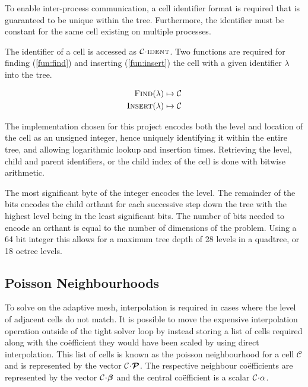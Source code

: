 \documentclass{IIBproject}
\newcommand{\vect}[1]{\bm{#1}}
\newcommand{\acc}{{\mkern 0.5mu\cdot\mkern 0.5mu}}
\begin{document}
To enable inter-process communication, a cell identifier format is required that is guaranteed to be unique within the tree. Furthermore, the identifier must be constant for the same cell existing on multiple processes. 

The identifier of a cell is accessed as $\mathcal{C}\acc\textproc{ident}$. Two functions are required for finding (\ref{fun:find}) and inserting (\ref{fun:insert}) the cell with a given identifier $\lambda$ into the tree.

\begin{align}
	\label{fun:find}
	\textproc{Find}(\lambda) \mapsto \mathcal{C} \\
	\label{fun:insert}
	\textproc{Insert}(\lambda) \mapsto \mathcal{C}
\end{align}

The implementation chosen for this project encodes both the level and location of the cell as an unsigned integer, hence uniquely identifying it within the entire tree, and allowing logarithmic lookup and insertion times. Retrieving the level, child and parent identifiers, or the child index of the cell is done with bitwise arithmetic. 

The most significant byte of the integer encodes the level. The remainder of the bits encodes the child orthant for each successive step down the tree with the highest level being in the least significant bits. The number of bits needed to encode an orthant is equal to the number of dimensions of the problem. Using a 64 bit integer this allows for a maximum tree depth of 28 levels in a quadtree, or 18 octree levels. 


\subsection{Poisson Neighbourhoods}

To solve on the adaptive mesh, interpolation is required in cases where the level of adjacent cells do not match. It is possible to move the expensive interpolation operation outside of the tight solver loop by instead storing a list of cells required along with the co\"efficient they would have been scaled by using direct interpolation. This list of cells is known as the poisson neighbourhood for a cell $\mathcal{C}$ and is represented by the vector $\mathcal{C}\acc\vect{\mathcal{P}}$. The respective neighbour co\"efficients are represented by the vector $\mathcal{C}\acc\vect{\beta}$ and the central co\"efficient is a scalar $\mathcal{C}\acc\alpha$. 
\end{document}
